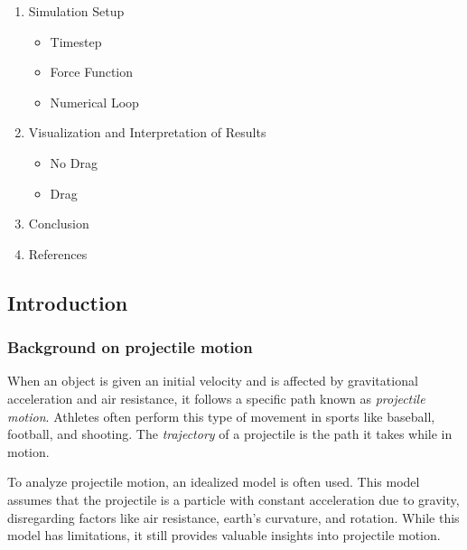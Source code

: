 \documentclass[11pt]{article}
\providecommand{\tightlist}{%
      \setlength{\itemsep}{0pt}\setlength{\parskip}{0pt}}
\begin{document}
\begin{enumerate}
\def\labelenumi{\arabic{enumi}.}
\setcounter{enumi}{2}
\item
  Simulation Setup

  \begin{itemize}
  \tightlist
  \item
    Timestep
  \item
    Force Function
  \item
    Numerical Loop
  \end{itemize}
\item
  Visualization and Interpretation of Results

  \begin{itemize}
  \tightlist
  \item
    No Drag
  \item
    Drag
  \end{itemize}
\item
  Conclusion
\item
  References
\end{enumerate}

    \hypertarget{introduction}{%
\subsection{\texorpdfstring{\textbf{Introduction}}{Introduction}}\label{introduction}}

\hypertarget{background-on-projectile-motion}{%
\subsubsection{\texorpdfstring{\textbf{Background on projectile
motion}}{Background on projectile motion}}\label{background-on-projectile-motion}}

When an object is given an initial velocity and is affected by
gravitational acceleration and air resistance, it follows a specific
path known as \emph{projectile motion}. Athletes often perform this type
of movement in sports like baseball, football, and shooting. The
\emph{trajectory} of a projectile is the path it takes while in motion.

To analyze projectile motion, an idealized model is often used. This
model assumes that the projectile is a particle with constant
acceleration due to gravity, disregarding factors like air resistance,
earth's curvature, and rotation. While this model has limitations, it
still provides valuable insights into projectile motion.
\end{document}
